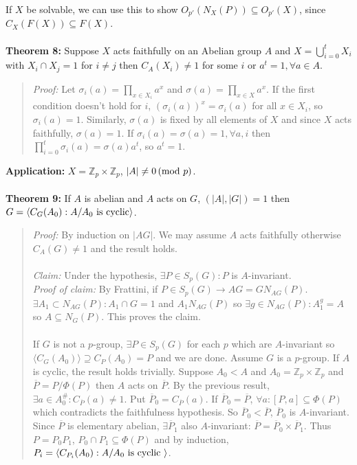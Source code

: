 If $X$ be solvable, we can use this to show $O_{p'}(N_X(P)) \subseteq O_{p'}(X)$, since $C_X(F(X)) \subseteq F(X)$.
\\
\\
{\bf Theorem 8:}
Suppose $X$ acts faithfully on an Abelian group $A$ and $X= \bigcup_{i=0}^t X_i$ with 
$X_i \cap X_j =1$ for $i \ne j$ then $C_A(X_i) \ne 1$ for some $i$ or
$a^t=1, \forall a \in A$.
\begin{quote}
\emph{Proof:} 
Let $\sigma_i(a)= \prod_{x \in X_i} a^x$ and
$\sigma(a)= \prod_{x \in X} a^x$.  
If the first condition doesn't hold for $i$, $(\sigma_i(a))^x = \sigma_i(a)$ for
all $x \in X_i$, so $\sigma_i(a) = 1$.  Similarly, $\sigma(a)$ is fixed
by all elements of $X$ and since $X$ acts faithfully, $\sigma(a) = 1$.
If $\sigma_i(a)=\sigma(a)= 1, \forall a, i$ then
$\prod_{i=0}^t \sigma_i(a)= \sigma(a) a^t$, so $a^t=1$.
\end{quote}
{\bf Application:} $X= {\mathbb Z}_p \times {\mathbb Z}_p$, $|A| \ne 0 \thinspace \textnormal{(mod } p \textnormal{)}$.
\\
\\
{\bf Theorem 9:}
If $A$ is abelian and $A$ acts on $G$, $(|A|, |G|)=1$ then 
$G= \langle C_G(A_0): A/A_0 \textnormal{ is cyclic} \rangle $.
\begin{quote}
\emph{Proof:} 
By induction on $|AG|$.  We may assume $A$ acts faithfully otherwise $C_A(G) \ne 1$ and
the result holds.  
\\
\\
\emph{Claim:} Under the hypothesis, $\exists P \in S_p(G): P$ is
$A$-invariant. 
\\
\emph{Proof of claim:}  By Frattini, if $P \in S_p(G) \rightarrow AG=GN_{AG}(P)$.
$\exists A_1 \subset N_{AG}(P): A_1 \cap G=1$ and $A_1 N_{AG}(P)$ so $\exists g \in N_{AG}(P):
A_1^g=A$ so $A \subseteq N_G(P)$.   This proves the claim.
\\
\\
If $G$ is not a $p$-group, $\exists P \in S_p(G)$ for each $p$ which are $A$-invariant
so $ \langle C_G(A_0) \rangle \supseteq C_P(A_0)=P$ and we are done.
Assume $G$ is a $p$-group.  If $A$ is cyclic, the result holds trivially.  Suppose
$A_0 < A$ and $A_0= {\mathbb Z}_p \times {\mathbb Z}_p$ and ${\overline P}= P/\Phi(P)$ then
$A$ acts on ${\overline P}$.  By the previous result,
$\exists a \in A_0^{\#}: C_{\overline P}(a) \ne 1$.  Put
${\overline P}_0= C_{\overline P}(a)$.
If ${\overline P}_0={\overline P}$, $\forall a: [P, a] \subseteq \Phi (P)$ which contradicts
the faithfulness hypothesis.  So ${\overline P}_0 < {\overline P}$, ${\overline P}_0$ is
$A$-invariant.  Since ${\overline P}$ is elementary abelian, $\exists {\overline P}_1$
also $A$-invariant: ${\overline P}= {\overline P}_0 \times {\overline P}_1$.  Thus
$P= P_0 P_1$, $P_0 \cap P_1 \subseteq \Phi (P)$ and by induction,
$P_i= \langle C_{P_i}(A_0): A/A_0 \textnormal{ is cyclic } \rangle $.
\end{quote}
